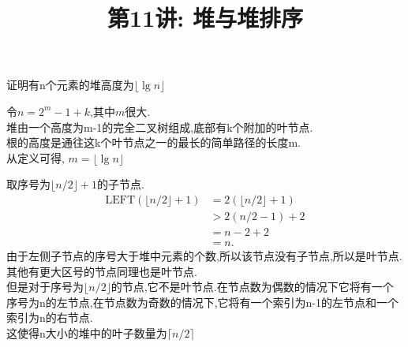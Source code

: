 \documentclass[a4paper, justified]{tufte-handout}
\title{第11讲: 堆与堆排序}
\date{\zhtoday} %
\begin{document}
\maketitle
\noplagiarism %
\begin{abstract}
\end{abstract}
\beginrequired

\begin{problem}[TC 6.1-2]
证明有n个元素的堆高度为$\lfloor \lg n \rfloor$
\end{problem}

\begin{solution}
  令$n = 2^m − 1 + k$,其中$m$很大.\\
  堆由一个高度为m-1的完全二叉树组成,底部有k个附加的叶节点.\\
  根的高度是通往这k个叶节点之一的最长的简单路径的长度m.\\
  从定义可得, $m = \lfloor \lg n \rfloor$

\end{solution}


\begin{problem}[TC 6.1-7]
\end{problem}

\begin{solution}
  取序号为$\lfloor n/2 \rfloor + 1$的子节点.\\
  $$
    \begin{aligned}
      \text{LEFT}(\lfloor n / 2 \rfloor + 1) & = 2(\lfloor n / 2 \rfloor + 1) \\
                                             & > 2(n / 2 - 1) + 2             \\
                                             & = n - 2 + 2                    \\
                                             & = n.
    \end{aligned}
  $$
  由于左侧子节点的序号大于堆中元素的个数,所以该节点没有子节点,所以是叶节点.其他有更大区号的节点同理也是叶节点.
  \\
  但是对于序号为$\lfloor n/2 \rfloor$的节点,它不是叶节点.在节点数为偶数的情况下它将有一个序号为n的左节点,在节点数为奇数的情况下,它将有一个索引为n-1的左节点和一个索引为n的右节点.\\
  这使得n大小的堆中的叶子数量为$\lceil n / 2\rceil$
\end{solution}
\end{document}
